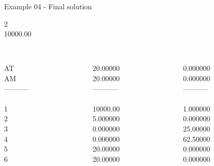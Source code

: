 \begin{frame}{Example 04 - Final solution}

  2\\
  10000.00\\

\begin{columns}[t]
\begin{column}{0.3\textwidth}
\\
AT\\
AM\\
-----------\\
\\
1\\
2\\
3\\
4\\
5\\
6\\

\end{column}
\begin{column}{0.3\textwidth}
\\
20.00000\\
20.00000\\

-----------\\
\\
10000.00\\
5.000000\\
0.000000\\
0.000000\\
20.00000\\
20.00000\\

\end{column}  

\begin{column}{0.3\textwidth}
\\
0.000000\\
0.000000\\

-----------\\
\\
1.000000\\
0.000000\\
25.00000\\
62.50000\\
0.000000\\
0.000000\\
\end{column}
\end{columns}  
\end{frame}
